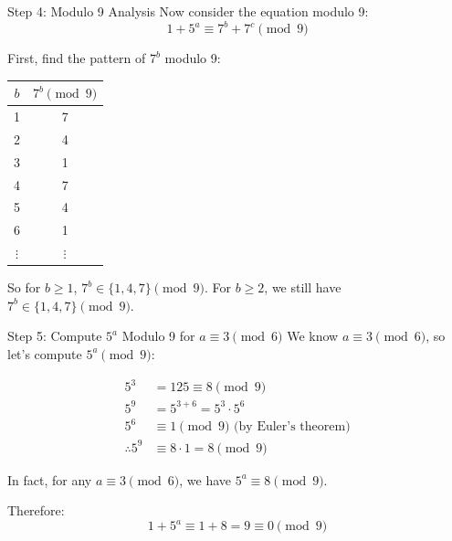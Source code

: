 ﻿\documentclass[10pt,aspectratio=169]{beamer}
\begin{document}
\begin{frame}{Step 4: Modulo 9 Analysis}
    Now consider the equation modulo 9:
    \[1 + 5^a \equiv 7^b + 7^c \pmod 9\]
    
    First, find the pattern of $7^b$ modulo 9:
    
    \begin{tabular}{c|c}
        $b$ & $7^b \pmod 9$ \\ \hline
        1 & 7 \\
        2 & 4 \\
        3 & 1 \\
        4 & 7 \\
        5 & 4 \\
        6 & 1 \\
        $\vdots$ & $\vdots$
    \end{tabular}
    
    \vspace{0.2cm}
    So for $b \geq 1$, $7^b \in \{1,4,7\} \pmod 9$. For $b \geq 2$, we still have $7^b \in \{1,4,7\} \pmod 9$.
\end{frame}

\begin{frame}{Step 5: Compute $5^a$ Modulo 9 for $a \equiv 3 \pmod 6$}
    We know $a \equiv 3 \pmod 6$, so let's compute $5^a \pmod 9$:
    
    \begin{align*}
        5^3 &= 125 \equiv 8 \pmod 9 \\
        5^9 &= 5^{3+6} = 5^3 \cdot 5^6 \\
        5^6 &\equiv 1 \pmod 9 \text{ (by Euler's theorem)} \\
        \therefore 5^9 &\equiv 8 \cdot 1 = 8 \pmod 9
    \end{align*}
    
    In fact, for any $a \equiv 3 \pmod 6$, we have $5^a \equiv 8 \pmod 9$.
    
    Therefore:
    \[1 + 5^a \equiv 1 + 8 = 9 \equiv 0 \pmod 9\]
\end{frame}
\end{document}
